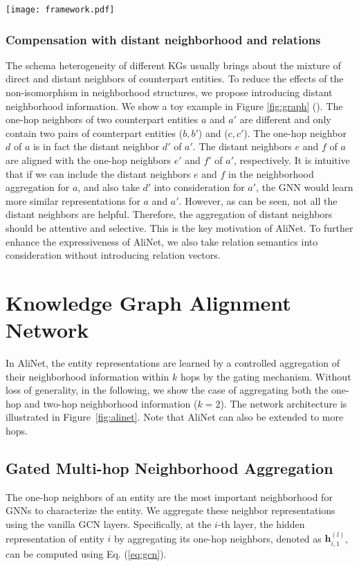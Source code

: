 \documentclass[letterpaper]{article} \usepackage{aaai20}  \usepackage{times}  \usepackage{helvet} \usepackage{courier}  \usepackage[hyphens]{url}  \usepackage{graphicx} \urlstyle{rm} \def\UrlFont{\rm}  \frenchspacing  \setlength{\pdfpagewidth}{8.5in}  \setlength{\pdfpageheight}{11in}  \usepackage{amsmath}
\begin{document}
\begin{figure*}[!t]
	\center
	\texttt{[image: framework.pdf]}
	\caption{Overview of the KG alignment network (AliNet) with gated two-hop neighborhood aggregation.}
	\label{fig:alinet}
\end{figure*}

\subsubsection{Compensation with distant neighborhood and relations} The schema heterogeneity of different KGs usually brings about the mixture of direct and distant neighbors of counterpart entities. To reduce the effects of the non-isomorphism in neighborhood structures, we propose introducing distant neighborhood information. We show a toy example in Figure \ref{fig:graph} (). The one-hop neighbors of two counterpart entities $a$ and $a'$ are different and only contain two pairs of counterpart entities ($b,b'$) and ($c,c'$). The one-hop neighbor $d$ of $a$ is in fact the distant neighbor $d'$ of $a'$. The distant neighbors $e$ and $f$ of $a$ are aligned with the one-hop neighbors $e'$ and $f'$ of $a'$, respectively. It is intuitive that if we can include the distant neighbors $e$ and $f$ in the neighborhood aggregation for $a$, and also take $d'$ into consideration for $a'$, the GNN would learn more similar representations for $a$ and $a'$. However, as can be seen, not all the distant neighbors are helpful. Therefore, the aggregation of distant neighbors should be attentive and selective. This is the key motivation of AliNet. To further enhance the expressiveness of AliNet, we also take relation semantics into consideration without introducing relation vectors.

\section{Knowledge Graph Alignment Network}

In AliNet, the entity representations are learned by a controlled aggregation of their neighborhood information within $k$ hops by the gating mechanism. Without loss of generality, in the following, we show the case of aggregating both the one-hop and two-hop neighborhood information ($k=2$). The network architecture is illustrated in Figure~\ref{fig:alinet}. Note that AliNet can also be extended to more hops.

\subsection{Gated Multi-hop Neighborhood Aggregation}
The one-hop neighbors of an entity are the most important neighborhood for GNNs to characterize the entity. We aggregate these neighbor representations using the vanilla GCN layers. Specifically, at the $i$-th layer, the hidden representation of entity $i$ by aggregating its one-hop neighbors, denoted as $\mathbf{h}_{i,1}^{(l)}$, can be computed using Eq. (\ref{eq:gcn}).
\end{document}
